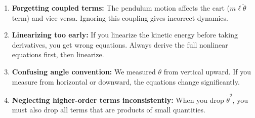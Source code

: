 \begin{example}
\begin{enumerate}
    \item \textbf{Forgetting coupled terms:} The pendulum motion affects the cart ($m\ell\ddot{\theta}$ term) and vice versa. Ignoring this coupling gives incorrect dynamics.

    \item \textbf{Linearizing too early:} If you linearize the kinetic energy before taking derivatives, you get wrong equations. Always derive the full nonlinear equations first, then linearize.

    \item \textbf{Confusing angle convention:} We measured $\theta$ from vertical upward. If you measure from horizontal or downward, the equations change significantly.

    \item \textbf{Neglecting higher-order terms inconsistently:} When you drop $\dot{\theta}^2$, you must also drop all terms that are products of small quantities.
\end{enumerate}

\end{example}

